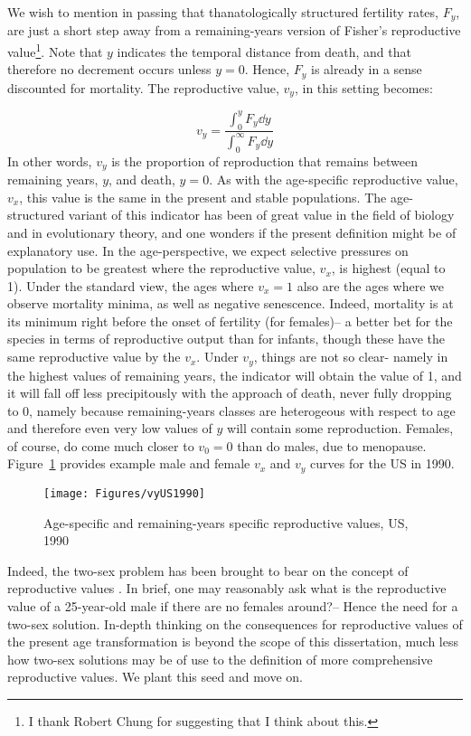 \FloatBarrier
\label{sec:fisher}
We wish to mention in passing that thanatologically structured fertility rates,
$F_y$, are just a short step away from a remaining-years version of Fisher's
\citep{fisher1999genetical} reproductive value\footnote{I thank Robert Chung
for suggesting that I think about this.}. Note that $y$ indicates the
temporal distance from death, and that therefore no decrement occurs unless $y=0$. 
Hence, $F_y$ is already in a sense discounted for mortality. The
reproductive value, $v_y$, in this setting becomes:

\begin{equation}
\label{eq:eyfisher}
v_y = \frac{\int _0 ^y F_y \dd y}{\int _0 ^\infty F_y \dd y} 
\end{equation}
In other words, $v_y$ is the proportion of reproduction that remains between
remaining years, $y$, and death, $y=0$. As with the age-specific
reproductive value, $v_x$, this value is the same in the present and stable
populations. The age-structured variant of this indicator has been of great 
value in the field of biology and in evolutionary theory, and one wonders
if the present definition might be of explanatory use. In the age-perspective,
we expect selective pressures on population to be greatest where the reproductive value,
$v_x$, is highest (equal to 1). Under the standard view, the ages
where $v_x = 1$ also are the ages where we observe mortality minima, as well as
negative senescence. Indeed, mortality is at its minimum right before the
onset of fertility (for females)-- a better bet for the species in terms of
reproductive output than for infants, though these have the same reproductive
value by the $v_x$. Under $v_y$, things are not so clear- namely in the highest
values of remaining years, the indicator will obtain the value of 1, and it will
fall off less precipitously with the approach of death, never fully dropping to
0, namely because remaining-years classes are heterogeous with respect to age
and therefore even very low values of $y$ will contain some reproduction.
Females, of course, do come much closer to $v_0 = 0$ than do males, due to
menopause. Figure~\ref{fig:vyUS1990} provides example male and female $v_x$ and
$v_y$ curves for the US in 1990.

 \begin{figure}
                \centering
                \caption{Age-specific and remaining-years specific reproductive
                values, US, 1990}
                \texttt{[image: Figures/vyUS1990]}
                \label{fig:vyUS1990}
\end{figure}

Indeed, the two-sex problem has been brought to bear on the concept of
reproductive values \citep{samuelson1977generalizing}. In brief, one may
reasonably ask what is the reproductive value of a 25-year-old male if there are
no females around?-- Hence the need for a two-sex solution. In-depth thinking 
on the consequences for reproductive values of the present age
transformation is beyond the scope of this dissertation, much less how two-sex
solutions may be of use to the definition of more comprehensive reproductive
values. We plant this seed and move on.

\FloatBarrier
